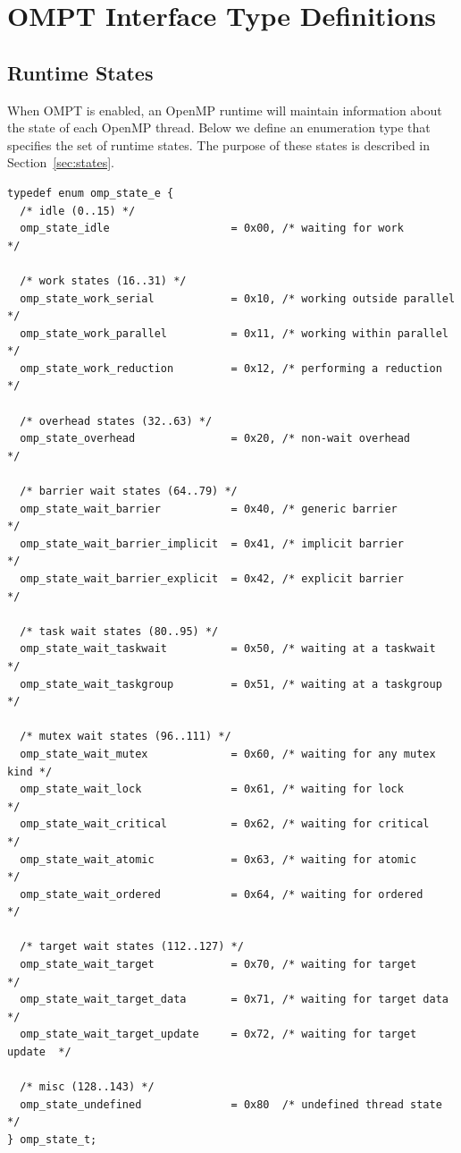\documentclass{article}
\begin{document}
 
 


\appendix
\clearpage


\section{OMPT Interface Type Definitions}
\label{appendix:ompt-types}
\subsection{Runtime States}
\label{appendix:ompt-types:states}

When OMPT is enabled, an OpenMP runtime will maintain information about the state of  each OpenMP thread. 
Below we define an enumeration type that specifies the set of runtime states. 
The purpose of these states is described in Section~\ref{sec:states}.

\begin{lstlisting}
typedef enum omp_state_e {
  /* idle (0..15) */
  omp_state_idle                   = 0x00, /* waiting for work           */

  /* work states (16..31) */
  omp_state_work_serial            = 0x10, /* working outside parallel   */
  omp_state_work_parallel          = 0x11, /* working within parallel    */
  omp_state_work_reduction         = 0x12, /* performing a reduction     */

  /* overhead states (32..63) */
  omp_state_overhead               = 0x20, /* non-wait overhead          */

  /* barrier wait states (64..79) */
  omp_state_wait_barrier           = 0x40, /* generic barrier            */
  omp_state_wait_barrier_implicit  = 0x41, /* implicit barrier           */
  omp_state_wait_barrier_explicit  = 0x42, /* explicit barrier           */

  /* task wait states (80..95) */
  omp_state_wait_taskwait          = 0x50, /* waiting at a taskwait      */
  omp_state_wait_taskgroup         = 0x51, /* waiting at a taskgroup     */

  /* mutex wait states (96..111) */
  omp_state_wait_mutex             = 0x60, /* waiting for any mutex kind */
  omp_state_wait_lock              = 0x61, /* waiting for lock           */
  omp_state_wait_critical          = 0x62, /* waiting for critical       */
  omp_state_wait_atomic            = 0x63, /* waiting for atomic         */
  omp_state_wait_ordered           = 0x64, /* waiting for ordered        */

  /* target wait states (112..127) */
  omp_state_wait_target            = 0x70, /* waiting for target         */ 
  omp_state_wait_target_data       = 0x71, /* waiting for target data    */ 
  omp_state_wait_target_update     = 0x72, /* waiting for target update  */ 

  /* misc (128..143) */
  omp_state_undefined              = 0x80  /* undefined thread state     */
} omp_state_t;
\end{lstlisting}
\clearpage
\end{document}
